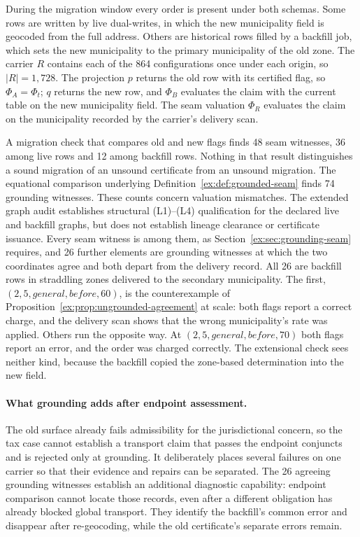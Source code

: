 \documentclass[11pt]{article}
\theoremstyle{definition}
\begin{document}
During the migration window every order is present under both schemas. Some rows are written by live dual-writes, in which the new municipality field is geocoded from the full address. Others are historical rows filled by a backfill job, which sets the new municipality to the primary municipality of the old zone. The carrier $R$ contains each of the 864 configurations once under each origin, so $|R|=1{,}728$. The projection $p$ returns the old row with its certified flag, so $\Phi_A=\Phi_t$; $q$ returns the new row, and $\Phi_B$ evaluates the claim with the current table on the new municipality field. The seam valuation $\Phi_R$ evaluates the claim on the municipality recorded by the carrier's delivery scan.

A migration check that compares old and new flags finds 48 seam witnesses, 36 among live rows and 12 among backfill rows. Nothing in that result distinguishes a sound migration of an unsound certificate from an unsound migration. The equational comparison underlying Definition~\ref{ex:def:grounded-seam} finds 74 grounding witnesses. These counts concern valuation mismatches. The extended graph audit establishes structural (L1)--(L4) qualification for the declared live and backfill graphs, but does not establish lineage clearance or certificate issuance. Every seam witness is among them, as Section~\ref{ex:sec:grounding-seam} requires, and 26 further elements are grounding witnesses at which the two coordinates agree and both depart from the delivery record. All 26 are backfill rows in straddling zones delivered to the secondary municipality. The first, $(2,5,\mathit{general},\mathit{before},60)$, is the counterexample of Proposition~\ref{ex:prop:ungrounded-agreement} at scale: both flags report a correct charge, and the delivery scan shows that the wrong municipality's rate was applied. Others run the opposite way. At $(2,5,\mathit{general},\mathit{before},70)$ both flags report an error, and the order was charged correctly. The extensional check sees neither kind, because the backfill copied the zone-based determination into the new field.

\paragraph{What grounding adds after endpoint assessment.}
The old surface already fails admissibility for the jurisdictional concern, so the tax case cannot establish a transport claim that passes the endpoint conjuncts and is rejected only at grounding. It deliberately places several failures on one carrier so that their evidence and repairs can be separated. The 26 agreeing grounding witnesses establish an additional diagnostic capability: endpoint comparison cannot locate those records, even after a different obligation has already blocked global transport. They identify the backfill's common error and disappear after re-geocoding, while the old certificate's separate errors remain.
\end{document}
